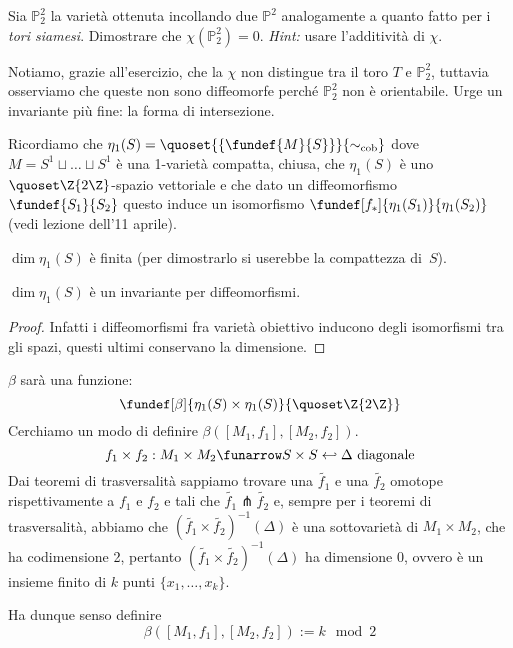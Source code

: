 \begin{ex}
	Sia $\mathbb{P}_2^2$ la varietà ottenuta incollando due $\mathbb{P}^2$ analogamente a quanto fatto per i \emph{tori siamesi}. Dimostrare che $\chi(\mathbb{P}_2^2) = 0$. \emph{Hint:} usare l'additività di $\chi$.
\end{ex}

\begin{oss}
Notiamo, grazie all'esercizio, che la $\chi$ non distingue tra il toro $T$ e $\mathbb{P}_2^2$, tuttavia osserviamo che queste non sono diffeomorfe perché $\mathbb{P}_2^2$ non è orientabile. Urge un invariante più fine: la forma di intersezione.
\end{oss}


Ricordiamo che $\eta_1(S) = \quoset{ \{ \fundef{M}{S} \} }{\sim_\text{cob}}$ dove $M = S^1 \sqcup \dots \sqcup S^1$ è una 1-varietà compatta, chiusa, che $\eta_1(S)$ è uno $\quoset\Z{2\Z}$-spazio vettoriale e che dato un diffeomorfismo $\fundef{S_1}{S_2}$ questo induce un isomorfismo $\fundef[f_*]{\eta_1(S_1)}{\eta_1(S_2)}$ (vedi lezione dell'11 aprile).

\begin{teo}
$\dim \eta_1(S)$ è finita (per dimostrarlo si userebbe la compattezza di~$S$).
\end{teo}

\begin{cor}
	$\dim \eta_1(S)$ è un invariante per diffeomorfismi.
\end{cor}
\begin{proof}
Infatti i diffeomorfismi fra varietà obiettivo inducono degli isomorfismi tra gli spazi, questi ultimi conservano la dimensione.
\end{proof}

\begin{defn} $\beta$ sarà una funzione: \[ \fundef[\beta]{\eta_1(S) \times \eta_1(S)}{\quoset\Z{2\Z}} \] Cerchiamo un modo di definire $\beta([M_1,f_1],[M_2,f_2])$.
\[ f_1 \times f_2: M_1 \times M_2 \funarrow S \times S \hookleftarrow \Delta \text{ diagonale} \]
Dai teoremi di trasversalità sappiamo trovare una $\tilde{f_1}$ e una $\tilde{f_2}$ omotope rispettivamente a $f_1$ e $f_2$ e tali che $\tilde{f_1} \pitchfork \tilde{f_2}$ e, sempre per i teoremi di trasversalità, abbiamo che $(\tilde{f_1} \times \tilde{f_2})^{-1}(\Delta)$ è una sottovarietà di $M_1 \times M_2$, che ha codimensione 2, pertanto $(\tilde{f_1} \times \tilde{f_2})^{-1}(\Delta)$ ha dimensione 0, ovvero è un insieme finito di $k$ punti $\{x_1, \dots , x_k \}$.

Ha dunque senso definire \[ \beta([M_1,f_1],[M_2,f_2]) := k \mod 2 \]
\end{defn}


